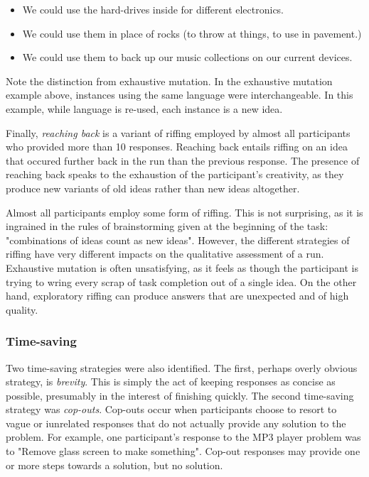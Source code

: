 \begin{itemize}
    \item We could use the hard-drives inside for different electronics.
    \item We could use them in place of rocks (to throw at things, to use in pavement.)
    \item We could use them to back up our music collections on our current devices.
\end{itemize}

Note the distinction from exhaustive mutation. In the exhaustive mutation example above, instances using the same language were interchangeable.
In this example, while language is re-used, each instance is a new idea.

Finally, \emph{reaching back} is a variant of riffing employed by almost all participants who provided more than 10 responses. Reaching back entails riffing on an idea that occured further back in the run than the previous response. The presence of reaching back speaks to the exhaustion of the participant's creativity, as they produce new variants of old ideas rather than new ideas altogether.

Almost all participants employ some form of riffing. This is not surprising, as it is ingrained in the rules of brainstorming given at the beginning of the task: "combinations of ideas count as new ideas". However, the different strategies of riffing have very different impacts on the qualitative assessment of a run. Exhaustive mutation is often unsatisfying, as it feels as though the participant is trying to wring every scrap of task completion out of a single idea. On the other hand, exploratory riffing can produce answers that are unexpected and of high quality. 

\subsubsection{Time-saving}

Two time-saving strategies were also identified. The first, perhaps overly obvious strategy, is \emph{brevity}. This is simply the act of keeping responses as concise as possible, presumably in the interest of finishing quickly. The second time-saving strategy was \emph{cop-outs}. Cop-outs occur when participants choose to resort to vague or iunrelated responses that do not actually provide any solution to the problem. For example, one participant's response to the MP3 player problem was to "Remove glass screen to make something". Cop-out responses may provide one or more steps towards a solution, but no solution.

